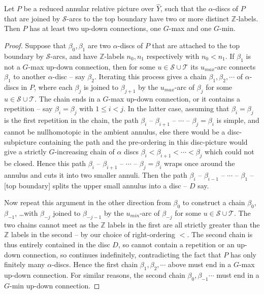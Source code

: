 \documentclass[10pt,a4paper]{amsart}
\def\Z{\mathbb{Z}}
\def\a{\alpha}
\def\b{\beta}
\def\cS{\mathcal{S}}
\def\cT{\mathcal{T}}
\def\wh{\widehat}
\begin{document}
 \begin{lem}	\label{surlepont}
 	Let $P$ be a reduced annular relative picture over $\wh Y$, 
 	such that the $\a$-discs of $P$ that are joined by $\cS$-arcs 
 	to the top boundary have two or more distinct $\Z$-labels.  
 	Then $P$ has at least two up-down connections, one $G$-max and one   $G$-min.
 \end{lem}

 \begin{proof}
 	Suppose that $\b_0,\b_1$ are two $\a$-discs of $P$ that are attached to the top boundary by $\cS$-arcs, and have $\Z$-labels $n_0,n_1$ respectively with $n_0<n_1$.   
 	If $\b_1$ is not a $G$-max up-down connection, 
 	then for some $u\in\cS\cup\cT$  its $u_{max}$-arc connects $\b_1$ to another $\a$-disc -- say $\b_2$.    
 	Iterating this process gives a  chain 
  $\b_1,\b_2,\cdots$ of $\a$-discs in $P$,  
 	where each $\b_j$ is joined to $\b_{j+1}$ by the  $u_{max}$-arc  of $\b_j$ for some $u\in\cS\cup\cT$.   
 	The chain ends in a  $G$-max up-down connection, 
 	or it contains a repetition -- say $\b_i=\b_j$ with $1\le i<j$. 
 	In the latter case, 
 		assuming that $\b_i=\b_j$ is the first repetition in the chain,
 	the path $\b_i$ -- $\b_{i+1}$ -- $\cdots$ -- $\b_j=\b_i$ 
 	 is simple, and cannot be nullhomotopic in 
 	 the ambient annulus, 
 	else there  would be a 
 	 disc-subpicture containing the path and the pre-ordering in this  disc-picture
 	would give a strictly $G$-increasing chain of $\a$ discs $\b_i<\b_{i+1}<\cdots<\b_j$ which 
 		could not be closed.   
 	 Hence
 	this path
 	 $\b_i$ -- $\b_{i+1}$ -- $\cdots$ -- $\b_j=\b_i$
 		wraps once around the annulus and cuts it 
 	into two smaller annuli.  
 	Then the path $\b_i$ -- $\b_{i-1}$ -- $\cdots$ -- $\b_1$ -- [top boundary] 
	splits the upper small annulus into a disc --  $D$ say.
 	
 	Now repeat this argument in the other direction from $\b_0$ to construct a 
 	chain $\b_0$, $\b_{-1}$, \dots with 
 	$\b_{-j}$ joined to $\b_{-j-1}$ 
 	by the $u_{min}$-arc of $\b_{-j}$ for some $u\in\cS\cup\cT$.  
 	The two chains cannot meet as the $\Z$ labels in the first are all strictly 
 	greater than the $\Z$ labels in the second
  -- by our choice of right-ordering $<$.
 	The second chain is thus entirely contained in the disc $D$, 
 	so cannot contain a repetition or an up-down connection, so continues indefinitely, 
 	contradicting the fact that $P$ has only finitely many $\a$-discs.  
 	Hence the first chain $\b_1,\b_2,\cdots$ above must end in a $G$-max up-down connection.   
 	For similar reasons, the second chain  $\b_0,\b_{-1}\cdots$ must end in a  
 	$G$-min up-down connection.
 \end{proof}
\end{document}
